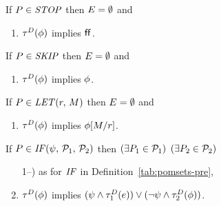 \begin{definition}
  If $\aPS\SB0\in\sSTOP$ then $\aEvs\SB0 = \emptyset$ and
  \begin{enumerate}
  \item $\aTr[\bEvs]\SB0(\aForm)$ implies $\FALSE$.
  \end{enumerate}

  \noindent
  If $\aPS\SB0\in\sSKIP$ then $\aEvs\SB0 = \emptyset$ and
  \begin{enumerate}
  \item $\aTr[\bEvs]\SB0(\aForm)$ implies $\aForm$.
  \end{enumerate}

  \noindent
  If $\aPS\SB0\in\sLET{\aReg}{\aExp}$ then $\aEvs\SB0 = \emptyset$ and
  \begin{enumerate}
  \item $\aTr[\bEvs]\SB0(\aForm)$ implies $\aForm[\aExp/\aReg]$.
  \end{enumerate}

  \noindent
  If $\aPS\SB0 \in \sIF{\bForm}\sTHEN\aPSS_1\sELSE\aPSS_2\sFI$ then
  $(\exists\aPS_1\in\aPSS_1)$ $(\exists\aPS_2\in\aPSS_2)$
  \begin{enumerate}
  \setcounter{enumi}{\value{pomsetPreIfCount}}
  \item[1--\thepomsetPreIfCount)] as for $\sIF{}$ in Definition~\ref{tab:pomsets-pre},
  \item $\aTr[\bEvs]\SB0(\aForm)$ implies $(\bForm\land\aTr[\bEvs]_1(\aEv))\lor(\neg\bForm\land\aTr[\bEvs]_2(\aForm))$.
  \end{enumerate}


\end{definition}
